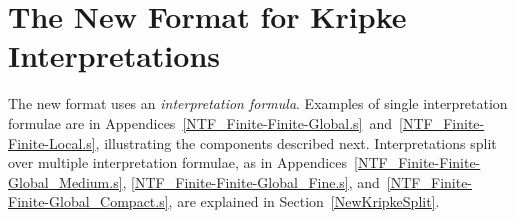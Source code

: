 \documentclass{easychair}
\begin{document}
\section{The New Format for Kripke Interpretations}
\label{NewKripke}
 
The new format uses an {\em interpretation formula}. 
Examples of single interpretation formulae are in 
Appendices~\ref{NTF_Finite-Finite-Global.s}~and~\ref{NTF_Finite-Finite-Local.s}, 
illustrating the components described next. 
Interpretations split over multiple interpretation formulae, as in 
Appendices~\ref{NTF_Finite-Finite-Global_Medium.s}, \ref{NTF_Finite-Finite-Global_Fine.s}, 
and~\ref{NTF_Finite-Finite-Global_Compact.s}, are explained in Section~\ref{NewKripkeSplit}.
\end{document}
